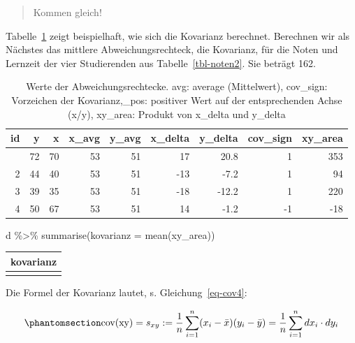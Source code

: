 \documentclass[
  letterpaper,
  twoside,
  open=any]{scrbook}
\newenvironment{Shaded}{\begin{snugshade}}{\end{snugshade}}
\newcommand{\AttributeTok}[1]{\textcolor[rgb]{0.40,0.45,0.13}{#1}}
\newcommand{\FunctionTok}[1]{\textcolor[rgb]{0.28,0.35,0.67}{#1}}
\newcommand{\NormalTok}[1]{\textcolor[rgb]{0.00,0.23,0.31}{#1}}
\newcommand{\SpecialCharTok}[1]{\textcolor[rgb]{0.37,0.37,0.37}{#1}}
\theoremstyle{definition}
\theoremstyle{definition}
\theoremstyle{definition}
\theoremstyle{remark}
\begin{document}
\begin{quote}
{} Kommen gleich!
\end{quote}

Tabelle~\ref{tbl-kov2} zeigt beispielhaft, wie sich die Kovarianz
berechnet. Berechnen wir als Nächstes das mittlere Abweichungsrechteck,
die Kovarianz, für die Noten und Lernzeit der vier Studierenden aus
Tabelle~\ref{tbl-noten2}. Sie beträgt 162.

\begin{longtable}[]{@{}rrrrrrrrr@{}}

\caption{\label{tbl-kov2}Werte der Abweichungsrechtecke. avg: average
(Mittelwert), cov\_sign: Vorzeichen der Kovarianz,\_pos: positiver Wert
auf der entsprechenden Achse (x/y), xy\_area: Produkt von x\_delta und
y\_delta}

\tabularnewline

\toprule\noalign{}
id & y & x & x\_avg & y\_avg & x\_delta & y\_delta & cov\_sign &
xy\_area \\
\midrule\noalign{}
\endhead
\bottomrule\noalign{}
\endlastfoot
1 & 72 & 70 & 53 & 51 & 17 & 20.8 & 1 & 353 \\
2 & 44 & 40 & 53 & 51 & -13 & -7.2 & 1 & 94 \\
3 & 39 & 35 & 53 & 51 & -18 & -12.2 & 1 & 220 \\
4 & 50 & 67 & 53 & 51 & 14 & -1.2 & -1 & -18 \\

\end{longtable}

\begin{Shaded}
\begin{Highlighting}[]
\NormalTok{d }\SpecialCharTok{\%\textgreater{}\%}
  \FunctionTok{summarise}\NormalTok{(}\AttributeTok{kovarianz =} \FunctionTok{mean}\NormalTok{(xy\_area))}
\end{Highlighting}
\end{Shaded}

\begin{longtable}[]{@{}r@{}}
\toprule\noalign{}
kovarianz \\
\midrule\noalign{}
\endhead
\bottomrule\noalign{}
\endlastfoot
162 \\
\end{longtable}

Die Formel der Kovarianz lautet, s. Gleichung~\ref{eq-cov4}:

\begin{equation}\phantomsection\label{eq-cov4}{\text{cov(xy)} = s_{xy}:=\frac{1}{n}\sum_{i=1}^n (x_i-\bar{x})(y_i-\bar{y}) = \frac{1}{n}\sum_{i=1}^n dx_i\cdot dy_i}\end{equation}
\end{document}
